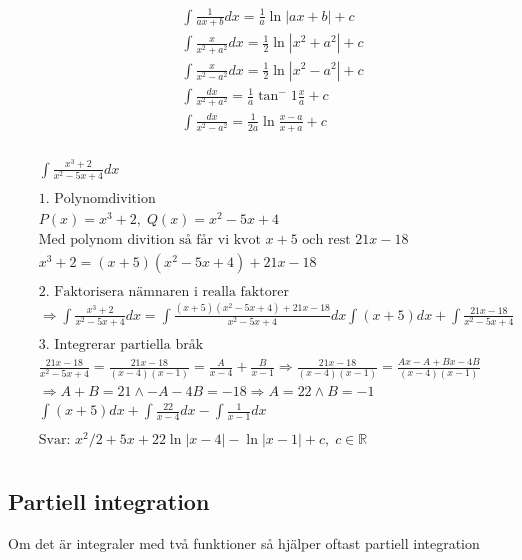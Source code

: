 \begin{align*}
  &\quad  \int \frac{1}{ax+b}dx = \frac{1}{a} \ln{|ax+b|} +c \\
  &\quad  \int \frac{x}{x^2+a^2}dx = \frac{1}{2} \ln{|x^2+a^2|} +c \\
  &\quad  \int \frac{x}{x^2-a^2}dx = \frac{1}{2} \ln{|x^2-a^2|} +c \\
  &\quad  \int \frac{dx}{x^2+a^2} = \frac{1}{a} \tan^-1{\frac{x}{a}} +c \\
  &\quad  \int \frac{dx}{x^2-a^2} = \frac{1}{2a} \ln{\frac{x-a}{x+a}} +c \\
\end{align*}


\begin{align*}
  &\quad  \int \frac{x^3+2}{x^2-5x+4}dx \\
  &\quad  \\
  &\quad  \text{1. Polynomdivition} \\
  &\quad  P(x)=x^3+2, \; Q(x)=x^2-5x+4 \\
  &\quad  \text{Med polynom divition så får vi kvot $x+5$ och rest $21x-18$} \\
  &\quad  x^3+2=(x+5)(x^2-5x+4) + 21x-18 \\
  &\quad  \\
  &\quad  \text{2. Faktorisera nämnaren i realla faktorer} \\
  &\quad  \Rightarrow \int \frac{x^3+2}{x^2-5x+4}dx = \int \frac{(x+5)(x^2-5x+4) + 21x-18}{x^2-5x+4}dx
  \int (x+5)dx + \int \frac{21x-18}{x^2-5x+4} \\
  &\quad  \\
  &\quad  \text{3. Integrerar partiella bråk} \\
  &\quad  \frac{21x-18}{x^2-5x+4} = \frac{21x-18}{(x-4)(x-1)} = \frac{A}{x-4} + \frac{B}{x-1}
  \Rightarrow \frac{21x-18}{(x-4)(x-1)} = \frac{Ax-A+Bx-4B}{(x-4)(x-1)} \\
  &\quad  \Rightarrow A+B=21 \land -A-4B=-18 \Rightarrow A=22 \land B=-1 \\
  &\quad  \int (x+5)dx + \int \frac{22}{x-4}dx - \int \frac{1}{x-1}dx \\
  &\quad  \\
  &\quad  \text{Svar: } x^2/2 +5x +22\ln{|x-4|} -\ln{|x-1|} +c, \; c \in \mathbb{R} \\
\end{align*}


\newpage


\subsection{Partiell integration}
Om det är integraler med två funktioner så hjälper oftast partiell integration

